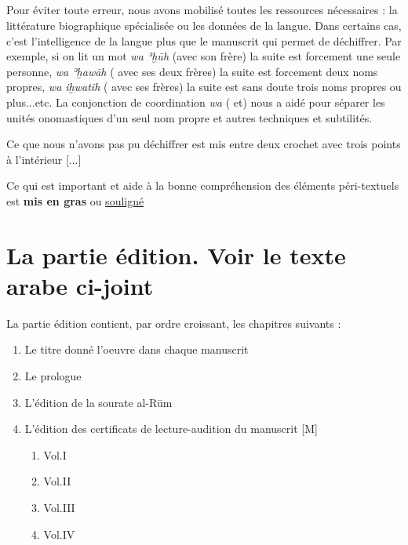 \documentclass[a4paper,12pt]{report}
\begin{document}
\begin{itemize}
\begin{enumerate}
\begin{french}
 
\paragraph{}
Pour éviter toute erreur,  nous avons mobilisé toutes les ressources nécessaires : la littérature biographique spécialisée ou les données de la langue. Dans certains cas, c'est  l'intelligence de la langue plus que le manuscrit qui permet de déchiffrer. Par exemple, si on lit un mot \textit{wa ʾḫūh} (avec son frère) la suite est forcement une seule personne, \textit{wa ʾḫawāh} ( avec ses deux frères) la suite est forcement deux noms propres, \textit{wa iḫwatih} ( avec ses frères) la suite est sans doute trois noms propres ou plus...etc. La  conjonction de coordination \textit{wa} ( et) nous a aidé pour séparer les unités onomastiques d'un seul nom propre et autres techniques et subtilités.   
   
Ce que nous n'avons pas pu déchiffrer est mis entre deux crochet avec trois points à l'intérieur [...] 

Ce qui est important et aide à la bonne compréhension des éléments péri-textuels    est \textbf{mis en gras} ou \underline{souligné} 
 

\end{french}



\chapter{La partie édition. Voir le texte arabe ci-joint} 

La partie édition contient, par ordre croissant,  les chapitres suivants  : 
\begin{enumerate}
    \item  Le titre donné l'oeuvre dans chaque manuscrit

    \item  Le prologue

    \item L'édition de la sourate al-R\=um

    \item L'édition des certificats de lecture-audition du manuscrit [M] 
    \begin{enumerate}
        \item Vol.I 
        \item Vol.II
        \item Vol.III
        \item Vol.IV
      

\end{enumerate}
\end{enumerate}
\end{enumerate}
\end{itemize}
\end{document}
